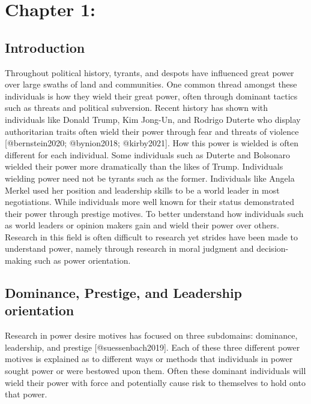 \documentclass[
]{article}
\author{}
\date{\vspace{-2.5em}}
\begin{document}
\hypertarget{chapter-1}{%
\section{Chapter 1:}\label{chapter-1}}

\hypertarget{introduction}{%
\subsection{Introduction}\label{introduction}}

Throughout political history, tyrants, and despots have influenced great
power over large swaths of land and communities. One common thread
amongst these individuals is how they wield their great power, often
through dominant tactics such as threats and political subversion.
Recent history has shown with individuals like Donald Trump, Kim
Jong-Un, and Rodrigo Duterte who display authoritarian traits often
wield their power through fear and threats of violence
{[}@bernstein2020; @bynion2018; @kirby2021{]}. How this power is wielded
is often different for each individual. Some individuals such as Duterte
and Bolsonaro wielded their power more dramatically than the likes of
Trump. Individuals wielding power need not be tyrants such as the
former. Individuals like Angela Merkel used her position and leadership
skills to be a world leader in most negotiations. While individuals more
well known for their status demonstrated their power through prestige
motives. To better understand how individuals such as world leaders or
opinion makers gain and wield their power over others. Research in this
field is often difficult to research yet strides have been made to
understand power, namely through research in moral judgment and
decision-making such as power orientation.

\hypertarget{dominance-prestige-and-leadership-orientation}{%
\subsection{Dominance, Prestige, and Leadership
orientation}\label{dominance-prestige-and-leadership-orientation}}

Research in power desire motives has focused on three subdomains:
dominance, leadership, and prestige {[}@suessenbach2019{]}. Each of
these three different power motives is explained as to different ways or
methods that individuals in power sought power or were bestowed upon
them. Often these dominant individuals will wield their power with force
and potentially cause risk to themselves to hold onto that power.
\end{document}

